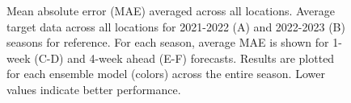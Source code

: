 \documentclass[
  letterpaper,
  DIV=11,
  numbers=noendperiod]{scrartcl}
\begin{document}
\begin{figure}


\caption{\label{fig-mae-vs-forecast-date}Mean absolute error (MAE)
averaged across all locations. Average target data across all locations
for 2021-2022 (A) and 2022-2023 (B) seasons for reference. For each
season, average MAE is shown for 1-week (C-D) and 4-week ahead (E-F)
forecasts. Results are plotted for each ensemble model (colors) across
the entire season. Lower values indicate better performance.}

\end{figure}%
\end{document}
